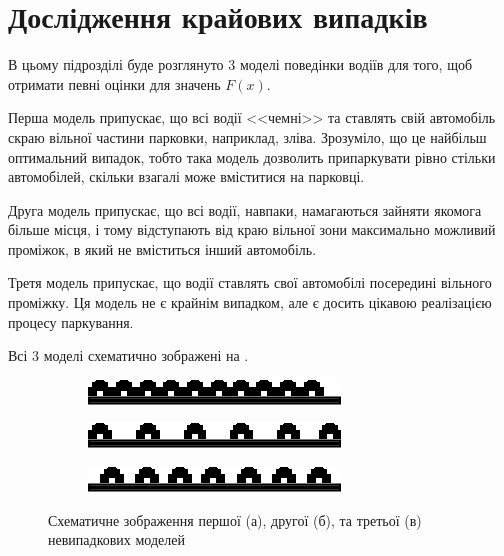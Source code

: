\section{Дослідження крайових випадків}

В цьому підрозділі буде розглянуто 3 моделі поведінки водіїв для того, щоб отримати певні оцінки для значень $F(x)$.

Перша модель припускає, що всі водії <<чемні>> та ставлять свій автомобіль скраю вільної частини парковки, наприклад, зліва. Зрозуміло, що це найбільш оптимальний випадок, тобто така модель дозволить припаркувати рівно стільки автомобілей, скільки взагалі може вміститися на парковці.

Друга модель припускає, що всі водії, навпаки, намагаються зайняти якомога більше місця, і тому відступають від краю вільної зони максимально можливий проміжок, в який не вміститься інший автомобіль.

Третя модель припускає, що водії ставлять свої автомобілі посередині вільного проміжку. Ця модель не є крайнім випадком, але є досить цікавою реалізацією процесу паркування.

Всі 3 моделі схематично зображені на .

\begin{figure}[bh]
	\begin{subfigure}[b]{0.32\textwidth}    
		\centering
		\includegraphics[width=1\linewidth]{chapter_Asymptotics/img/parking_trivial1}
		\caption{}
	\end{subfigure}
	\begin{subfigure}[b]{0.32\textwidth}    
		\centering
		\includegraphics[width=1\linewidth]{chapter_Asymptotics/img/parking_trivial2}
		\caption{}
	\end{subfigure}
	\begin{subfigure}[b]{0.32\textwidth}    
		\centering
		\includegraphics[width=1\linewidth]{chapter_Asymptotics/img/parking_trivial3}
		\caption{}
	\end{subfigure}
	\caption{Схематичне зображення першої (а), другої (б), та третьої (в) невипадкових моделей}
	\label{fig:trivial_cases}
\end{figure}


